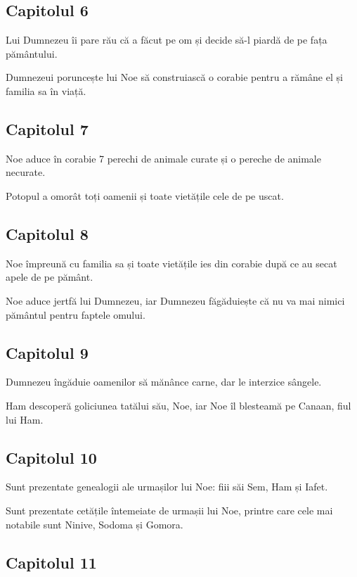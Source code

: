 \documentclass[12pt,a4paper]{article}
\begin{document}
\subsection{Capitolul 6}

Lui Dumnezeu îi pare rău că a făcut pe om și decide să-l piardă de pe fața pământului.

Dumnezeui poruncește lui Noe să construiască o corabie pentru a rămâne el și familia sa în viață.

\subsection{Capitolul 7}

Noe aduce în corabie 7 perechi de animale curate și o pereche de animale necurate.

Potopul a omorât toți oamenii și toate vietățile cele de pe uscat.

\subsection{Capitolul 8}

Noe împreună cu familia sa și toate vietățile ies din corabie după ce au secat apele de pe pământ.

Noe aduce jertfă lui Dumnezeu, iar Dumnezeu făgăduiește că nu va mai nimici pământul pentru faptele omului.

\subsection{Capitolul 9}

Dumnezeu îngăduie oamenilor să mănânce carne, dar le interzice sângele.

Ham descoperă goliciunea tatălui său, Noe, iar Noe îl blesteamă pe Canaan, fiul lui Ham.

\subsection{Capitolul 10}

Sunt prezentate genealogii ale urmașilor lui Noe: fiii săi Sem, Ham și Iafet.

Sunt prezentate cetățile întemeiate de urmașii lui Noe, printre
care cele mai notabile sunt Ninive, Sodoma și Gomora.

\subsection{Capitolul 11}
\end{document}

